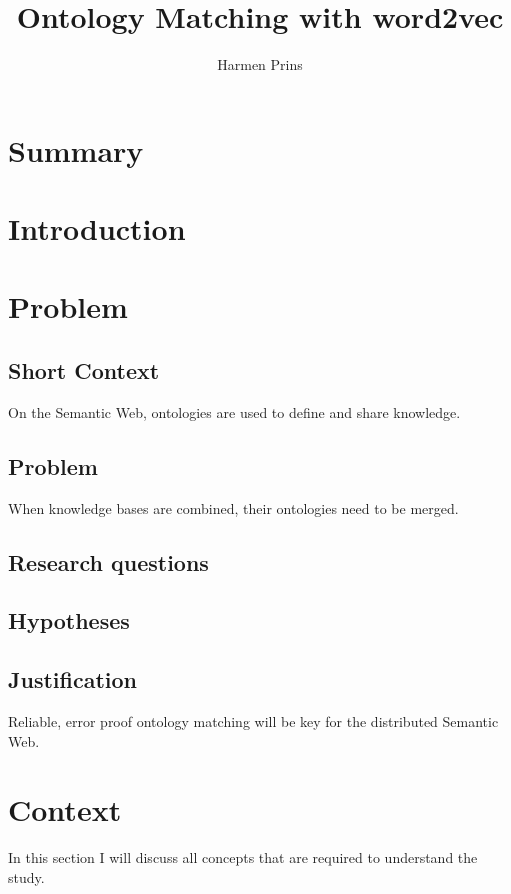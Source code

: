 \documentclass{article}
\title{Ontology Matching with word2vec}
\author{Harmen Prins}
\begin{document}
 \maketitle
 
 \section*{Summary}
 
 \tableofcontents
 
 \section{Introduction}

 \section{Problem}
 \subsection{Short Context}
 On the Semantic Web, ontologies are used to define and share knowledge.
 \subsection{Problem}
 When knowledge bases are combined, their ontologies need to be merged.
 \subsection{Research questions}
 
 \subsection{Hypotheses}
 
 
 \subsection{Justification}
 Reliable, error proof ontology matching will be key for the distributed Semantic Web.
 
 \section{Context}
 In this section I will discuss all concepts that are required to understand the study.
\end{document}
